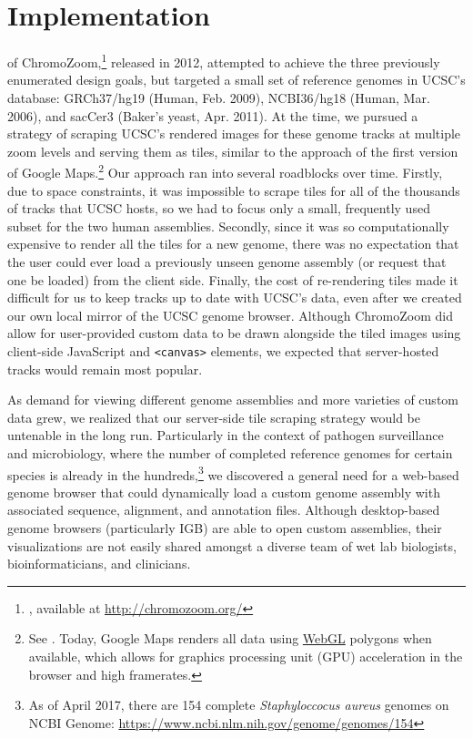 \section{Implementation}

 of ChromoZoom,\footnote{\textcite{Pak2013a}, available at \url{http://chromozoom.org/}} released in 2012, attempted to achieve the three previously enumerated design goals, but targeted a small set of reference genomes in UCSC's database: GRCh37/hg19 (Human, Feb. 2009), NCBI36/hg18 (Human, Mar. 2006), and sacCer3 (Baker's yeast, Apr. 2011). At the time, we pursued a strategy of scraping UCSC's rendered images for these genome tracks at multiple zoom levels and serving them as tiles, similar to the approach of the first version of Google Maps.\footnote{See \textcite{Skinner2009}. Today, Google Maps renders all data using \href{https://developer.mozilla.org/en-US/docs/Web/API/WebGL_API}{WebGL} polygons when available, which allows for graphics processing unit (GPU) acceleration in the browser and high framerates.} Our approach ran into several roadblocks over time. Firstly, due to space constraints, it was impossible to scrape tiles for all of the thousands of tracks that UCSC hosts, so we had to focus only a small, frequently used subset for the two human assemblies. Secondly, since it was so computationally expensive to render all the tiles for a new genome, there was no expectation that the user could ever load a previously unseen genome assembly (or request that one be loaded) from the client side. Finally, the cost of re-rendering tiles made it difficult for us to keep tracks up to date with UCSC's data, even after we created our own local mirror of the UCSC genome browser. Although ChromoZoom did allow for user-provided custom data to be drawn alongside the tiled images using client-side JavaScript and \texttt{<canvas>} elements, we expected that server-hosted tracks would remain most popular.

As demand for viewing different genome assemblies and more varieties of custom data grew, we realized that our server-side tile scraping strategy would be untenable in the long run. Particularly in the context of pathogen surveillance and microbiology, where the number of completed reference genomes for certain species is already in the hundreds,\footnote{As of April 2017, there are 154 complete \emph{Staphyloccocus aureus} genomes on NCBI Genome: \url{https://www.ncbi.nlm.nih.gov/genome/genomes/154}} we discovered a general need for a web-based genome browser that could dynamically load a custom genome assembly with associated sequence, alignment, and annotation files. Although desktop-based genome browsers (particularly IGB) are able to open custom assemblies, their visualizations are not easily shared amongst a diverse team of wet lab biologists, bioinformaticians, and clinicians.

